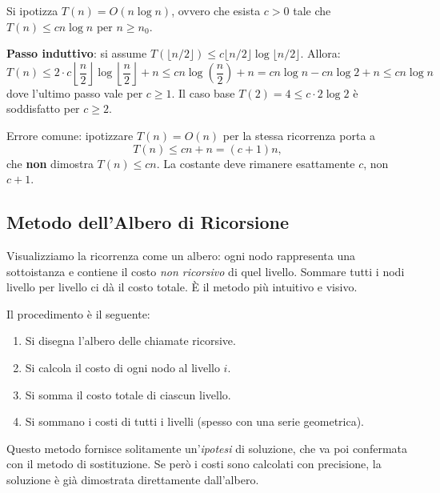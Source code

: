 \begin{esempio}[Sostituzione su $T(n) = 2T(\lfloor n/2 \rfloor) + n$]
	Si ipotizza $T(n) = O(n \log n)$, ovvero che esista $c > 0$ tale che $T(n) \leq cn \log n$ per $n \geq n_0$.
	
	\textbf{Passo induttivo}: si assume $T(\lfloor n/2 \rfloor) \leq c \lfloor n/2 \rfloor \log \lfloor n/2 \rfloor$. Allora:
	\[
	T(n) \leq 2 \cdot c \left\lfloor \frac{n}{2} \right\rfloor \log \left\lfloor \frac{n}{2} \right\rfloor + n
	\leq cn \log\!\left(\frac{n}{2}\right) + n
	= cn \log n - cn \log 2 + n
	\leq cn \log n
	\]
	dove l'ultimo passo vale per $c \geq 1$. Il caso base $T(2) = 4 \leq c \cdot 2 \log 2$ è soddisfatto per $c \geq 2$.
\end{esempio}

\begin{hardnote}
	Errore comune: ipotizzare $T(n) = O(n)$ per la stessa ricorrenza porta a
	\[
	T(n) \leq cn + n = (c+1)n,
	\]
	che \textbf{non} dimostra $T(n) \leq cn$. La costante deve rimanere esattamente $c$, non $c+1$.
\end{hardnote}

\subsection{Metodo dell'Albero di Ricorsione}

\begin{softnote}
	Visualizziamo la ricorrenza come un albero: ogni nodo rappresenta una sottoistanza e
	contiene il costo \emph{non ricorsivo} di quel livello. Sommare tutti i nodi livello per livello
	ci dà il costo totale. È il metodo più intuitivo e visivo.
\end{softnote}

Il procedimento è il seguente:
\begin{enumerate}
	\item Si disegna l'albero delle chiamate ricorsive.
	\item Si calcola il costo di ogni nodo al livello $i$.
	\item Si somma il costo totale di ciascun livello.
	\item Si sommano i costi di tutti i livelli (spesso con una serie geometrica).
\end{enumerate}

\begin{nota}
	Questo metodo fornisce solitamente un'\emph{ipotesi} di soluzione, che va poi confermata
	con il metodo di sostituzione. Se però i costi sono calcolati con precisione, la soluzione
	è già dimostrata direttamente dall'albero.
\end{nota}

